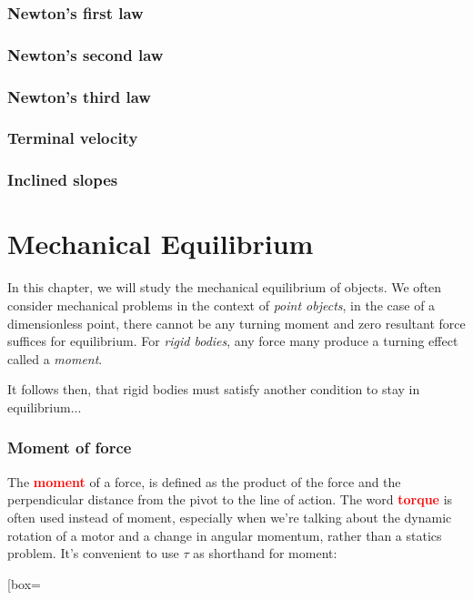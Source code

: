 \documentclass[a4paper,12pt]{book}
\newenvironment{ilight}
  {\centering
  	\vspace*{6pt}
  	\begin{tcolorbox}[colframe=Gray,colback=LightGrey!15]
  \setlength{\baselineskip}{\baselineskip}%
  }
  {\end{tcolorbox}\vspace*{-4pt}}
\newcommand{\keypoint}[1]{\textbf{\textcolor{red}{#1}}}
\newcommand{\tcbhighmath}[1]{\boxed{#1}}
\newcommand{\keypoint}[1]{\textbf{\textcolor{red}{#1}}}
\begin{document}
	
	
	
\subsection*{Newton's first law}

\subsection*{Newton's second law}

	

\subsection*{Newton's third law}

\subsection*{Terminal velocity}

\subsection*{Inclined slopes}

\cleardoublepage

\chapter{Mechanical Equilibrium}

In this chapter, we will study the mechanical equilibrium of objects. We often consider mechanical problems in the context of \emph{point objects}, in the case of a dimensionless point, there cannot be any turning moment and zero resultant force suffices for equilibrium. For \emph{rigid bodies}, any force many produce a turning effect called a \emph{moment}.

It follows then, that rigid bodies must satisfy another condition to stay in equilibrium...

\subsection{Moment of force}

\begin{ilight}
	The \keypoint{moment} of a force, is defined as the product of the force and the perpendicular distance from the pivot to the line of action. The word \keypoint{torque} is often used instead of moment, especially when we're  talking about the dynamic rotation of a motor and a change in angular momentum, rather than a statics problem. It's convenient to use $\tau$ as shorthand for moment: \begin{empheq}[box=\tcbhighmath]{equation*}{\tau = Fd_\perp} \end{empheq}
\end{ilight}
\end{document}

